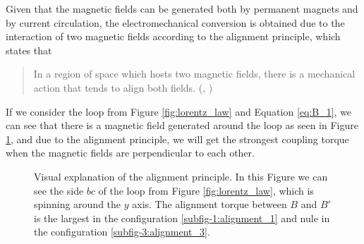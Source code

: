 \begin{description}
Given that the magnetic fields can be generated both by permanent magnets and by current circulation, the electromechanical conversion is obtained due to the interaction of two magnetic fields according to the alignment principle, which states that
\blockquote{In a region of space which hosts two magnetic fields, there is a mechanical action that tends to align both fields. (\citeauthor{sistemi_di_controllo:2007}, \citeyear{sistemi_di_controllo:2007})}

If we consider the loop from Figure \ref{fig:lorentz_law} and Equation \ref{eq:B_1}, we can see that there is a magnetic field generated around the loop as seen in Figure \ref{fig:alignment}, and due to the alignment principle, we will get the strongest coupling torque when the magnetic fields are perpendicular to each other.

\begin{figure}[htbp]
	\centering
    \hfill
    \hfill
    \caption[Visual explanation of the alignment principle]{Visual explanation of the alignment principle. In this Figure we can see the side $bc$ of the loop from Figure \ref{fig:lorentz_law}, which is spinning around the $y$ axis. The alignment torque between $B$ and $B'$ is the largest in the configuration \ref{subfig-1:alignment_1} and nule in the configuration \ref{subfig-3:alignment_3}.}
    \label{fig:alignment}
\end{figure}


\end{description}
